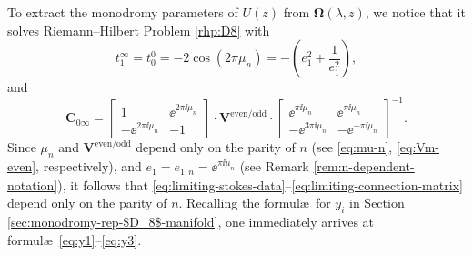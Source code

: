 To extract the monodromy parameters of $U(z)$ from $\mathbf{\Omega}(\lambda, z)$, we notice that it solves Riemann--Hilbert Problem \ref{rhp:D8} with
\begin{equation}\label{eq:limiting-stokes-data}
t_1^\infty = t_0^0 = -2\cos(2\pi \mu_n)= -\left(e_1^2+\frac{1}{e_1^2}\right),
\end{equation}
and
\begin{equation}
\mathbf{C}_{0\infty} = \begin{bmatrix} 1 & \ee^{2\pi \ii \mu_n} \\ -\ee^{2\pi \ii \mu_n} & -1 \end{bmatrix} \cdot \mathbf{V}^\mathrm{even/odd} \cdot \begin{bmatrix} \ee^{\pi \ii \mu_n}& \ee^{\pi \ii \mu_n}\\ - \ee^{3\pi \ii \mu_n} & - \ee^{-\pi \ii \mu_n} \end{bmatrix}^{-1}.
\label{eq:limiting-connection-matrix}
\end{equation}
Since $\mu_n$ and $\mathbf{V}^\mathrm{even/odd}$ depend only on the parity of $n$ (see \eqref{eq:mu-n}, \eqref{eq:Vm-even}, respectively), and ${e_1 = e_{1, n} = \ee^{\pi \ii \mu_n}}$ (see Remark \ref{rem:n-dependent-notation}), it follows that \eqref{eq:limiting-stokes-data}--\eqref{eq:limiting-connection-matrix} depend only on the parity of $n$. Recalling the formul\ae\ for $y_i$ in Section \ref{sec:monodromy-rep-$D_8$-manifold}, one immediately arrives at formul\ae\ \eqref{eq:y1}--\eqref{eq:y3}.

